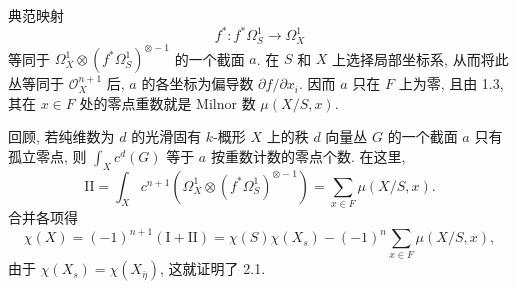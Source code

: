 典范映射
\[
f^*:f^*\Omega_S^1\longrightarrow\Omega_X^1
\]
等同于 $\Omega_X^1\otimes(f^*\Omega_S^1)^{\otimes-1}$ 的一个截面 $a$. 在 $S$ 和 $X$ 上选择局部坐标系, 从而将此丛等同于 $\mathcal O_X^{n+1}$ 后, $a$ 的各坐标为偏导数 $\partial f/\partial x_i$. 因而 $a$ 只在 $F$ 上为零, 且由 1.3, 其在 $x\in F$ 处的零点重数就是 Milnor 数 $\mu(X/S,x)$.

回顾, 若纯维数为 $d$ 的光滑固有 $k$-概形 $X$ 上的秩 $d$ 向量丛 $G$ 的一个截面 $a$ 只有孤立零点, 则 $\int_Xc^d(G)$ 等于 $a$ 按重数计数的零点个数. 在这里,
\[
\mathrm{II}=\int_Xc^{n+1}\!\left(
\Omega_X^1\otimes(f^*\Omega_S^1)^{\otimes-1}\right)
=\sum_{x\in F}\mu(X/S,x).
\]
合并各项得
\[
\chi(X)=(-1)^{n+1}(\mathrm I+\mathrm{II})
=\chi(S)\chi(X_s)-(-1)^n\sum_{x\in F}\mu(X/S,x),
\]
由于 $\chi(X_s)=\chi(X_{\bar\eta})$, 这就证明了 2.1.
